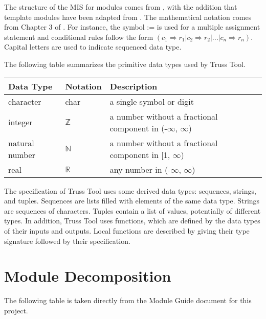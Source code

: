 \documentclass[12pt, titlepage]{article}
\begin{document}
The structure of the MIS for modules comes from \citet{HoffmanAndStrooper1995},
with the addition that template modules have been adapted from
\cite{GhezziEtAl2003}.  The mathematical notation comes from Chapter 3 of
\citet{HoffmanAndStrooper1995}.  For instance, the symbol := is used for a
multiple assignment statement and conditional rules follow the form $(c_1
\Rightarrow r_1 | c_2 \Rightarrow r_2 | ... | c_n \Rightarrow r_n )$.
Capital letters are used to indicate sequenced data type. 

The following table summarizes the primitive data types used by Truss Tool. 

\begin{center}
\renewcommand{\arraystretch}{1.2}
\noindent 
\begin{tabular}{l l p{7.5cm}} 
\toprule 
\textbf{Data Type} & \textbf{Notation} & \textbf{Description}\\ 
\midrule
character & char & a single symbol or digit\\
integer & $\mathbb{Z}$ & a number without a fractional component in (-$\infty$, $\infty$) \\
natural number & $\mathbb{N}$ & a number without a fractional component in [1, $\infty$) \\
real & $\mathbb{R}$ & any number in (-$\infty$, $\infty$)\\
\bottomrule
\end{tabular} 
\end{center}

\noindent
The specification of  Truss Tool uses some derived data types: sequences, strings, and
tuples. Sequences are lists filled with elements of the same data type. Strings
are sequences of characters. Tuples contain a list of values, potentially of
different types. In addition, Truss Tool uses functions, which
are defined by the data types of their inputs and outputs. Local functions are
described by giving their type signature followed by their specification.

\section{Module Decomposition}

The following table is taken directly from the Module Guide document for this project.
\end{document}
